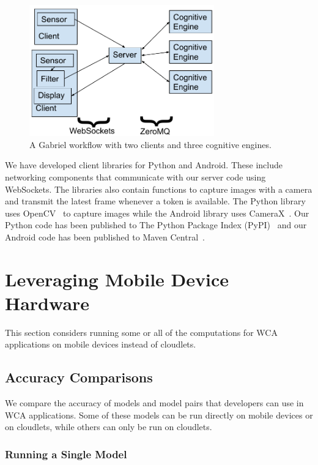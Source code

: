 \begin{figure}[h!]
  \includegraphics[width=8cm]{figures/runtime_architecture.pdf}
  \caption{A Gabriel workflow with two clients and three cognitive engines.
  }\label{fig:runtime_architecture}
\end{figure}

We have developed client libraries for Python and Android. These include
networking components that communicate with our server code using WebSockets.
The libraries also contain functions to capture images with a camera and
transmit the latest frame whenever a token is available. The Python library uses
OpenCV~\cite{opencv_library} to capture images while the Android library uses
CameraX~\cite{camerax}. Our Python code has been published to The Python Package
Index (PyPI)~\cite{gabriel_server, gabriel_python_client} and our Android code
has been published to Maven Central~\cite{gabriel_android_client}.

\section{Leveraging Mobile Device Hardware}

This section considers running some or all of the computations for WCA
applications on mobile devices instead of cloudlets.

\subsection{Accuracy Comparisons}

We compare the accuracy of models and model pairs that developers can use in WCA
applications.
Some of these models can be run directly on mobile devices or on cloudlets,
while others can only be run on cloudlets.

\subsubsection{Running a Single Model}\label{sec:single_model}

